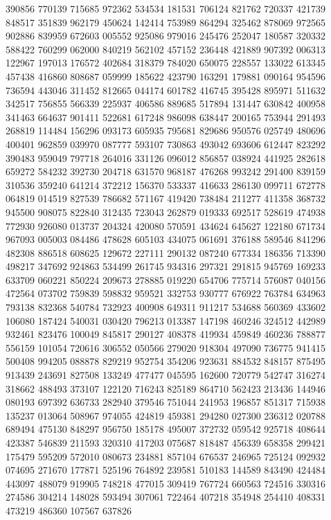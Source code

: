 {390856 770139 715685 972362 534534 181531 706124 821762 720337 421739 848517%
351839 962179 450624 142414 753989 864294 325462 878069 972565 902886 839959%
672603 005552 925086 979016 245476 252047 180587 320332 588422 760299 062000%
840219 562102 457152 236448 421889 907392 006313 122967 197013 176572 402684%
318379 784020 650075 228557 133022 613345 457438 416860 808687 059999 185622%
423790 163291 179881 090164 954596 736594 443046 311452 812665 044174 601782%
416745 395428 895971 511632 342517 756855 566339 225937 406586 889685 517894%
131447 630842 400958 341463 664637 901411 522681 617248 986098 638447 200165%
753944 291493 268819 114484 156296 093173 605935 795681 829686 950576 025749%
480696 400401 962859 039970 087777 593107 730863 493042 693606 612447 823292%
390483 959049 797718 264016 331126 096012 856857 038924 441925 282618 659272%
584232 392730 204718 631570 968187 476268 993242 291400 839159 310536 359240%
641214 372212 156370 533337 416633 286130 099711 672778 064819 014519 827539%
786682 571167 419420 738484 211277 411358 368732 945500 908075 822840 312435%
723043 262879 019333 692517 528619 474938 772930 926080 013737 204324 420080%
570591 434624 645627 122180 671734 967093 005003 084486 478628 605103 434075%
061691 376188 589546 841296 482308 886518 608625 129672 227111 290132 087240%
677334 186356 713390 498217 347692 924863 534499 261745 934316 297321 291815%
945769 169233 633709 060221 850224 209673 278885 019220 654706 775714 576087%
040156 472564 073702 759839 598832 959521 332753 930777 676922 763784 634963%
793138 832368 540784 732923 400908 649311 911217 534688 560369 433602 106080%
187424 540031 030420 796213 013387 147198 460246 324512 442989 932461 823476%
100049 845817 290127 408378 419934 459849 460236 788877 556159 101054 720616%
306552 050566 279020 918304 497090 736775 941415 500408 994205 088878 829219%
952754 354206 923631 884532 848157 875495 913439 243691 827508 133249 477477%
045595 162600 720779 542747 316274 318662 488493 373107 122120 716243 825189%
864710 562423 213436 144946 080193 697392 636733 282940 379546 751044 241953%
196857 851317 715938 135237 013064 508967 974055 424819 459381 294280 027300%
236312 020788 689494 475130 848297 956750 185178 495007 372732 059542 925718%
408644 423387 546839 211593 320310 417203 075687 818487 456339 658358 299421%
175479 595209 572010 080673 234881 857104 676537 246965 725124 092932 074695%
271670 177871 525196 764892 239581 510183 144589 843490 424484 443097 488079%
919905 748218 477015 309419 767724 660563 724516 330316 274586 304214 148028%
593494 307061 722464 407218 354948 254410 408331 473219 486360 107567 637826%
}
